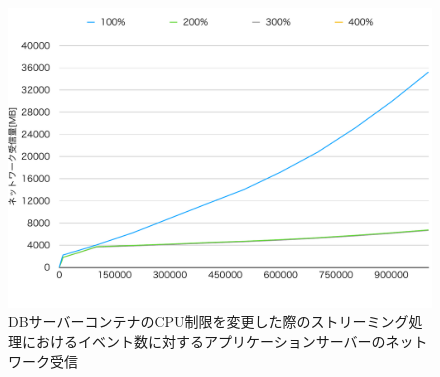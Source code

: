 \documentclass[../../../../../main]{subfiles}
\begin{document}
    \begin{figure}[H]
        \centering
        \includegraphics[width=12cm]{graph}
        \caption{DBサーバーコンテナのCPU制限を変更した際のストリーミング処理におけるイベント数に対するアプリケーションサーバーのネットワーク受信}
        \label{fig:stream-change-db-cpu-limit-app-net-in-app_4_8192-db_1024}
    \end{figure}
\end{document}
